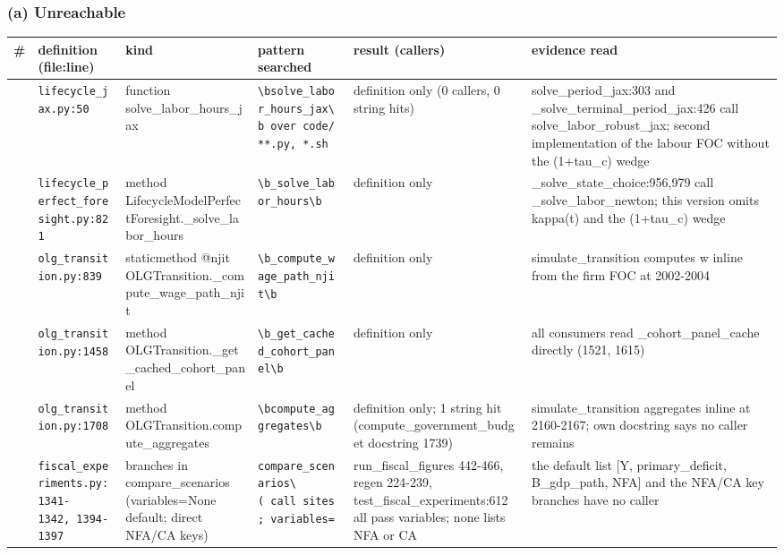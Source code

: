 

\subsubsection*{(a) Unreachable}\label{a-unreachable}

\begin{longtable}{@{}>{\raggedright\arraybackslash}p{0.5cm}>{\raggedright\arraybackslash}p{3.3cm}>{\raggedright\arraybackslash}p{2.0cm}>{\raggedright\arraybackslash}p{2.5cm}>{\raggedright\arraybackslash}p{4.4cm}>{\raggedright\arraybackslash}p{3.4cm}@{}}
\toprule\noalign{}
\# & definition (file:line) & kind & pattern searched & result (callers)
& evidence read \\
\midrule\noalign{}
\endhead
\bottomrule\noalign{}
\endlastfoot
1 & \texttt{lifecycle\_jax.py:50} & function solve\_labor\_hours\_jax &
\texttt{\textbackslash{}bsolve\_labor\_hours\_jax\textbackslash{}b\ over\ code/**.py,\ *.sh}
& definition only (0 callers, 0 string hits) & solve\_period\_jax:303
and \_solve\_terminal\_period\_jax:426 call solve\_labor\_robust\_jax;
second implementation of the labour FOC without the (1+tau\_c) wedge \\
2 & \texttt{lifecycle\_perfect\_foresight.py:821} & method
LifecycleModelPerfectForesight.\_solve\_labor\_hours &
\texttt{\textbackslash{}b\_solve\_labor\_hours\textbackslash{}b} &
definition only & \_solve\_state\_choice:956,979 call
\_solve\_labor\_newton; this version omits kappa(t) and the (1+tau\_c)
wedge \\
3 & \texttt{olg\_transition.py:839} & staticmethod @njit
OLGTransition.\_compute\_wage\_path\_njit &
\texttt{\textbackslash{}b\_compute\_wage\_path\_njit\textbackslash{}b} &
definition only & simulate\_transition computes w inline from the firm
FOC at 2002-2004 \\
4 & \texttt{olg\_transition.py:1458} & method
OLGTransition.\_get\_cached\_cohort\_panel &
\texttt{\textbackslash{}b\_get\_cached\_cohort\_panel\textbackslash{}b}
& definition only & all consumers read \_cohort\_panel\_cache directly
(1521, 1615) \\
5 & \texttt{olg\_transition.py:1708} & method
OLGTransition.compute\_aggregates &
\texttt{\textbackslash{}bcompute\_aggregates\textbackslash{}b} &
definition only; 1 string hit (compute\_government\_budget docstring
1739) & simulate\_transition aggregates inline at 2160-2167; own
docstring says no caller remains \\
6 & \texttt{fiscal\_experiments.py:1341-1342,\ 1394-1397} & branches in
compare\_scenarios (variables=None default; direct NFA/CA keys) &
\texttt{compare\_scenarios\textbackslash{}(\ call\ sites;\ variables=} &
run\_fiscal\_figures 442-466, regen 224-239,
test\_fiscal\_experiments:612 all pass variables; none lists NFA or CA &
the default list {[}Y, primary\_deficit, B\_gdp\_path, NFA{]} and the
NFA/CA key branches have no caller \\
\end{longtable}

